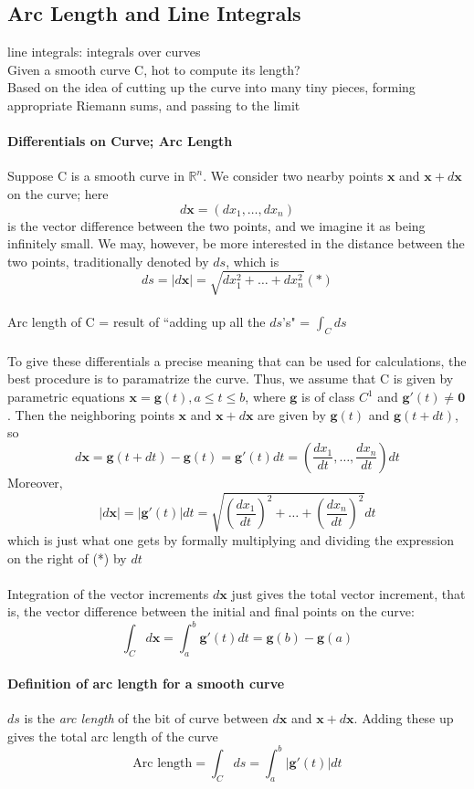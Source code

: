 \documentclass[11pt]{article}
\newcommand{\ti}[1]{\textit{#1}}
\newcommand{\tb}[1]{\textbf{#1}}
\newcommand{\real}[0]{\mathbb{R}}
\newcommand{\vx}[0]{\tb{x}}
\newcommand{\vo}[0]{\tb{0}}
\begin{document}
\subsection{Arc Length and Line Integrals}
line integrals: integrals over curves\\
Given a smooth curve C, hot to compute its length? \\
Based on the idea of cutting up the curve into many tiny pieces, forming appropriate Riemann sums, and passing to the limit
\paragraph{Differentials on Curve; Arc Length} Suppose C is a smooth curve in $\real^n$. We consider two nearby points $\vx$ and $\vx + d\vx$ on the curve; here
$$d\vx = (dx_1,\hdots,dx_n)$$
is the vector difference between the two points, and we imagine it as being infinitely small. We may, however, be more interested in the distance between the two points, traditionally denoted by $ds$, which is $$ds = |d\vx| = \sqrt{dx^2_1+\hdots+dx^2_n}(*)$$\\
Arc length of C = result of ``adding up all the $ds$'s" = $\int_Cds$\\\\
To give these differentials a precise meaning that can be used for calculations, the best procedure is to paramatrize the curve. Thus, we assume that C is given by parametric equations $\vx = \tb{g}(t), a\leq t \leq b$, where $\tb{g}$ is of class $C^1$ and $\tb{g}'(t) \neq \vo$. Then the neighboring points $\vx$ and $\vx + d\vx$ are given by $\tb{g}(t)$ and $\tb{g}(t+dt)$, so $$d\vx = \tb{g}(t+dt) - \tb{g}(t) = \tb{g}'(t)dt = (\frac{dx_1}{dt},\hdots,\frac{dx_n}{dt})dt$$ Moreover,
$$|d\vx| = |\tb{g}'(t)|dt = \sqrt{(\frac{dx_1}{dt})^2+ \hdots + (\frac{dx_n}{dt})^2}dt$$which is just what one gets by formally multiplying and dividing the expression on the right of (*) by $dt$\\\\
Integration of the vector increments $d\vx$ just gives the total vector increment, that is, the vector difference between the initial and final points on the curve:
$$\int_C d\vx = \int_a^b \tb{g}'(t)dt = \tb{g}(b)-\tb{g}(a)$$
\paragraph{Definition of arc length for a smooth curve}
$ds$ is the \ti{arc length} of the bit of curve between $d\vx$ and $\vx + d\vx$. Adding these up gives the total arc length of the curve
$$\mbox{Arc length} = \int_C ds = \int_a^b|\tb{g}'(t)|dt$$
\end{document}
